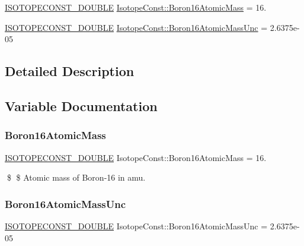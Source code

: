 \begin{DoxyCompactItemize}
\item 
\mbox{\hyperlink{group___isotope_const-_macros_ga8f45a7272ce02c0b4c65c44636ed719a}{I\+S\+O\+T\+O\+P\+E\+C\+O\+N\+S\+T\+\_\+\+D\+O\+U\+B\+LE}} \mbox{\hyperlink{group___isotope_const-_boron-_b16_gad144d5ce4ad4fed04c7b91e93b211fc0}{Isotope\+Const\+::\+Boron16\+Atomic\+Mass}} = 16.
\item 
\mbox{\hyperlink{group___isotope_const-_macros_ga8f45a7272ce02c0b4c65c44636ed719a}{I\+S\+O\+T\+O\+P\+E\+C\+O\+N\+S\+T\+\_\+\+D\+O\+U\+B\+LE}} \mbox{\hyperlink{group___isotope_const-_boron-_b16_ga0ae02f223d011c1f6dcf1eba43486607}{Isotope\+Const\+::\+Boron16\+Atomic\+Mass\+Unc}} = 2.\+6375e-\/05
\end{DoxyCompactItemize}


\subsection{Detailed Description}


\subsection{Variable Documentation}
\mbox{\label{group___isotope_const-_boron-_b16_gad144d5ce4ad4fed04c7b91e93b211fc0}} 
\subsubsection{\texorpdfstring{Boron16\+Atomic\+Mass}{Boron16AtomicMass}}
{\footnotesize\ttfamily \mbox{\hyperlink{group___isotope_const-_macros_ga8f45a7272ce02c0b4c65c44636ed719a}{I\+S\+O\+T\+O\+P\+E\+C\+O\+N\+S\+T\+\_\+\+D\+O\+U\+B\+LE}} Isotope\+Const\+::\+Boron16\+Atomic\+Mass = 16.}

\$ \$ Atomic mass of Boron-\/16 in amu. \mbox{\label{group___isotope_const-_boron-_b16_ga0ae02f223d011c1f6dcf1eba43486607}} 
\subsubsection{\texorpdfstring{Boron16\+Atomic\+Mass\+Unc}{Boron16AtomicMassUnc}}
{\footnotesize\ttfamily \mbox{\hyperlink{group___isotope_const-_macros_ga8f45a7272ce02c0b4c65c44636ed719a}{I\+S\+O\+T\+O\+P\+E\+C\+O\+N\+S\+T\+\_\+\+D\+O\+U\+B\+LE}} Isotope\+Const\+::\+Boron16\+Atomic\+Mass\+Unc = 2.\+6375e-\/05}

